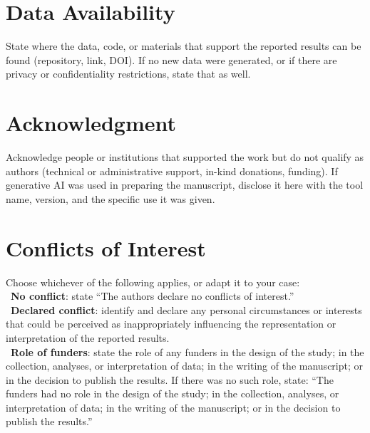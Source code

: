 \documentclass[lettersize,journal]{IEEEtran}
\begin{document}
\section*{Data Availability}
State where the data, code, or materials that support the reported
results can be found (repository, link, DOI). If no new data were
generated, or if there are privacy or confidentiality restrictions,
state that as well.

\section*{Acknowledgment}
Acknowledge people or institutions that supported the work but do
not qualify as authors (technical or administrative support, in-kind
donations, funding). If generative AI was used in preparing the
manuscript, disclose it here with the tool name, version, and the
specific use it was given.

\section*{Conflicts of Interest}
Choose whichever of the following applies, or adapt it to your
case: \\
\textbullet\ \textbf{No conflict}: state ``The authors declare no
conflicts of interest.'' \\
\textbullet\ \textbf{Declared conflict}: identify and declare any
personal circumstances or interests that could be perceived as
inappropriately influencing the representation or interpretation of
the reported results. \\
\textbullet\ \textbf{Role of funders}: state the role of any funders
in the design of the study; in the collection, analyses, or
interpretation of data; in the writing of the manuscript; or in the
decision to publish the results. If there was no such role, state:
``The funders had no role in the design of the study; in the
collection, analyses, or interpretation of data; in the writing of the
manuscript; or in the decision to publish the results.''

\balance




\end{document}
